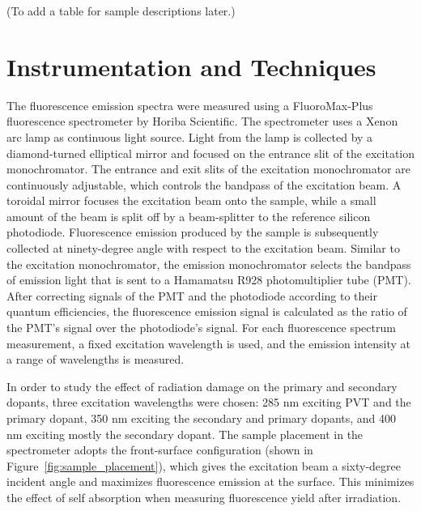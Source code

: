 \documentclass[preprint,12pt]{elsarticle}
\begin{document}
(To add a table for sample descriptions later.)

\section{Instrumentation and Techniques}
The fluorescence emission spectra were measured using a FluoroMax-Plus fluorescence spectrometer by Horiba Scientific. 
The spectrometer uses a Xenon arc lamp as continuous light source. 
Light from the lamp is collected by a diamond-turned elliptical mirror and focused on the entrance slit of the excitation monochromator. 
The entrance and exit slits of the excitation monochromator are continuously adjustable, 
which controls the bandpass of the excitation beam. 
A toroidal mirror focuses the excitation beam onto the sample, while a small amount of the beam is split off by a beam-splitter 
to the reference silicon photodiode. 
Fluorescence emission produced by the sample is subsequently collected at ninety-degree angle with respect to the excitation beam. 
Similar to the excitation monochromator, the emission monochromator selects the bandpass of emission light that is sent to 
a Hamamatsu R928 photomultiplier tube (PMT). 
After correcting signals of the PMT and the photodiode according to their quantum efficiencies, 
the fluorescence emission signal is calculated as the ratio of the PMT's signal over the photodiode's signal. 
For each fluorescence spectrum measurement, a fixed excitation wavelength is used, 
and the emission intensity at a range of wavelengths is measured. 

In order to study the effect of radiation damage on the primary and secondary dopants, three excitation wavelengths were chosen: 
285 nm 	exciting PVT and the primary dopant, 
350 nm exciting the secondary and primary dopants, 
and 400 nm exciting mostly the secondary dopant. 
The sample placement in the spectrometer adopts the front-surface configuration (shown in Figure~\ref{fig:sample_placement}), 
which gives the excitation beam a sixty-degree incident angle and maximizes fluorescence emission at the surface. 
This minimizes the effect of self absorption when measuring fluorescence yield after irradiation. 
\end{document}

